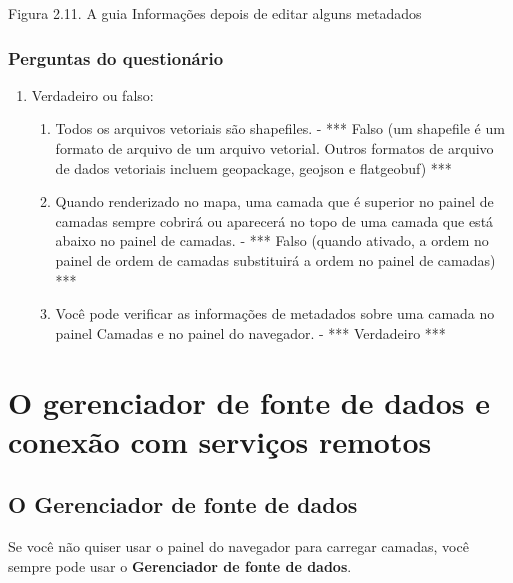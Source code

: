 \documentclass[
  portuguese,
]{krantz}
\providecommand{\tightlist}{%
  \setlength{\itemsep}{0pt}\setlength{\parskip}{0pt}}
\begin{document}
Figura 2.11. A guia Informações depois de editar alguns metadados

\hypertarget{perguntas-do-questionuxe1rio-4}{%
\subsubsection{Perguntas do questionário}\label{perguntas-do-questionuxe1rio-4}}

\begin{enumerate}
\def\labelenumi{\arabic{enumi}.}
\item
  Verdadeiro ou falso:

  \begin{enumerate}
  \def\labelenumii{\arabic{enumii}.}
  \tightlist
  \item
    Todos os arquivos vetoriais são shapefiles. - *** Falso (um shapefile é um formato de arquivo de um arquivo vetorial. Outros formatos de arquivo de dados vetoriais incluem geopackage, geojson e flatgeobuf) ***
  \item
    Quando renderizado no mapa, uma camada que é superior no painel de camadas sempre cobrirá ou aparecerá no topo de uma camada que está abaixo no painel de camadas. - *** Falso (quando ativado, a ordem no painel de ordem de camadas substituirá a ordem no painel de camadas) ***
  \item
    Você pode verificar as informações de metadados sobre uma camada no painel Camadas e no painel do navegador. - *** Verdadeiro ***
  \end{enumerate}
\end{enumerate}

\hypertarget{o-gerenciador-de-fonte-de-dados-e-conexuxe3o-com-serviuxe7os-remotos}{%
\section{O gerenciador de fonte de dados e conexão com serviços remotos}\label{o-gerenciador-de-fonte-de-dados-e-conexuxe3o-com-serviuxe7os-remotos}}

\hypertarget{o-gerenciador-de-fonte-de-dados}{%
\subsection{\texorpdfstring{\textbf{O Gerenciador de fonte de dados}}{O Gerenciador de fonte de dados}}\label{o-gerenciador-de-fonte-de-dados}}

Se você não quiser usar o painel do navegador para carregar camadas, você sempre pode usar o \textbf{Gerenciador de fonte de dados}.
\end{document}
